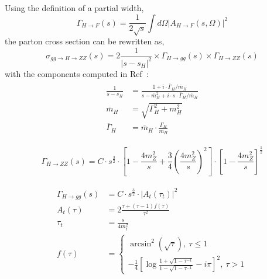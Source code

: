 Using the definition of a partial width,
\begin{equation} \label{eq:PartialWidth}
    \Gamma_{H \to F} (s) = \frac{1}{2\sqrt{s}}  \int d \Omega \left | A_{H \to F}(s,\Omega) \right |^2
\end{equation}
the parton cross section can be rewritten as,
\begin{equation} \label{eq:HiggsPartonXSection}
    \sigma_{gg \to H \to ZZ} (s) = 2 \frac{1}{ \left | s - s_H \right |^2}  \times \Gamma_{H \to gg} (s) \times \Gamma_{H \to ZZ} (s)
\end{equation}
with the components computed in Ref~\cite{Goria:2011wa,Spira1995}:
\begin{align} \label{eq:propagator}
\begin{split}
    \frac{1}{s - s_H} &= \frac{ 1 + i \cdot \overline{\Gamma}_H / \overline{m}_H} { s - \overline{m}_H^2 +  i \cdot s \cdot\overline{\Gamma}_H / \overline{m}_H }  \\
    \overline{m}_H &= \sqrt{\Gamma_H^2 + m_H^2} \\
    \overline{\Gamma}_H &= \overline{m}_H  \cdot \frac{\Gamma_H}{m_H}
\end{split}
\end{align}

\begin{equation} \label{eq:WidthZZ}
    \Gamma_{H \to ZZ} (s) = C \cdot s^{\frac{3}{2}} \cdot \left [ 1 - \frac{4m_Z^2}{s} + \frac{3}{4}\left ( \frac{4m_Z^2}{s} \right )^2 \right ] \cdot \left [ 1 - \frac{4m_Z^2}{s} \right ]^{\frac{1}{2}}
\end{equation}

\begin{align} \label{eq:WidthGG}
\begin{split}
    \Gamma_{H \to gg} (s) &= C \cdot s^{\frac{3}{2}} \cdot \left | A_t(\tau_t) \right |^{2} \\
    A_t(\tau) &= 2 \frac{\tau+(\tau-1)f(\tau)}{\tau^2} \\
    \tau_t &= \frac{s}{4m_t^2} \\
    f(\tau) &= \left\{\begin{matrix}
    \arcsin^2 (\sqrt{\tau}) , ~ \tau \leqslant 1
    \\
    - \frac{1}{4} \left [  \log{\frac{1+\sqrt{1-\tau^{-1}}}{1-\sqrt{1-\tau^{-1}}}}  - i  \pi \right ]^2 , ~ \tau > 1
    \end{matrix}\right.
\end{split}
\end{align}

